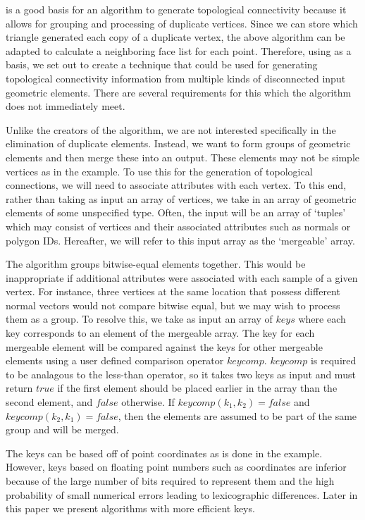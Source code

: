 \documentclass[10pt,journal,cspaper,compsoc]{IEEEtran}
\begin{document}
 is a good basis for an algorithm to generate topological connectivity because it allows for
grouping and processing of duplicate vertices. Since we can store which triangle generated each copy of a duplicate vertex,
 the above algorithm can be adapted to calculate a neighboring face list for each point. Therefore, using  as a basis, we set out to create a technique that could be used for generating topological connectivity information 
from multiple kinds of disconnected input geometric elements. There are several requirements for this which the  algorithm
does not immediately meet.

Unlike the creators of the  algorithm, we are not interested specifically in the elimination of duplicate elements. Instead, we want
to form groups of geometric elements and then merge these into an output. These elements may not be simple vertices as in the  example.
To use this for the generation of topological connections, we will need to associate attributes with each vertex. To this end, rather than taking as input an array of vertices,
we take in an array of geometric elements of some unspecified type. Often, the input will be an array of `tuples' which may consist of
vertices and their associated attributes such as normals or polygon IDs. Hereafter, we will refer to this input array as the `mergeable' array.

The  algorithm groups bitwise-equal elements together. 
This would be inappropriate if additional attributes were associated with
each sample of a given vertex. For instance, three vertices at the same location that possess different normal vectors
would not compare bitwise equal, but we may wish to process them as a group. To resolve this, we take as input an array of $keys$ where
each key corresponds to an element of the mergeable array. The key for each mergeable element will be compared against the keys for
other mergeable elements using a user defined comparison operator $keycomp$. $keycomp$ is required to be analagous to the less-than operator, so
it takes two keys as input and must return $true$ if the first element should be placed earlier in the array than the second element, and $false$
otherwise. If $keycomp(k_1, k_2) = false$ and $keycomp(k_2, k_1) = false$, then the elements are assumed to be part of the same group and will be merged.

The keys can be based off of point coordinates as is done in the  example. However, keys based on floating point numbers such as coordinates are inferior because of the large number of bits required to represent them and the high probability of small numerical errors leading to lexicographic differences. Later in this paper we present algorithms with more efficient keys.
\end{document}
